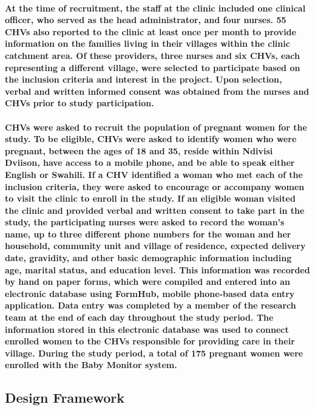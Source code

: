 \paragraph{At the time of recruitment, the staff at the clinic included one clinical officer, who served as the head administrator, and four nurses. 55 CHVs also reported to the clinic at least once per month to provide information on the families living in their villages within the clinic catchment area. Of these providers, three nurses and six CHVs, each representing a different village, were selected to participate based on the inclusion criteria and interest in the project. Upon selection, verbal and written informed consent was obtained from the nurses and CHVs prior to study participation.}

\paragraph{CHVs were asked to recruit the population of pregnant women for the study. To be eligible, CHVs were asked to identify women who were pregnant, between the ages of 18 and 35, reside within Ndivisi Dviison, have access to a mobile phone, and be able to speak either English or Swahili. If a CHV identified a woman who met each of the inclusion criteria, they were asked to encourage or accompany women to visit the clinic to enroll in the study. If an eligible woman visited the clinic and provided verbal and written consent to take part in the study, the participating nurses were asked to record the woman's name, up to three different phone numbers for the woman and her household,  community unit and village of residence, expected delivery date, gravidity, and other basic demographic information including age, marital status, and education level. This information was recorded by hand on paper forms, which were compiled and entered into an electronic database using FormHub, mobile phone-based data entry application. Data entry was completed by a member of the research team at the end of each day throughout the study period. The information stored in this electronic database was used to connect enrolled women to the CHVs responsible for providing care in their village. During the study period, a total of 175 pregnant women were enrolled with the Baby Monitor system.}

\subsection{Design Framework}
